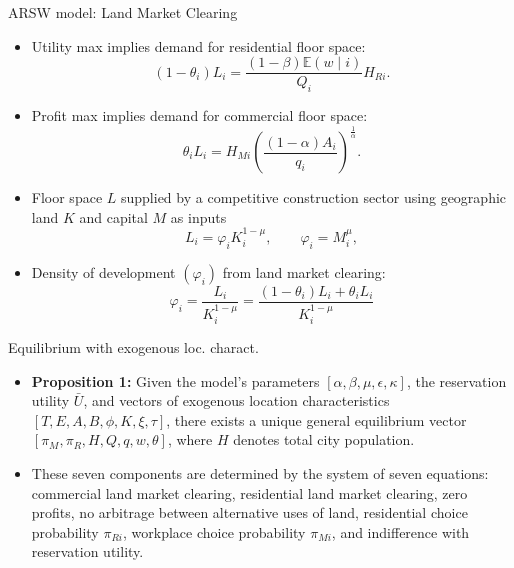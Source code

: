 \documentclass[10pt,notes=hide]{beamer}
\begin{document}
\begin{frame}{ARSW model:  Land Market Clearing}
\begin{itemize}
\item Utility max implies demand for residential floor space:
\begin{equation*} \label{eq:res_mc}
(1-\theta_{i}) L_{i} = \frac{ (1-\beta) \mathbb{E}(w \mid i) }{Q_i} H_{Ri}.
\end{equation*}
\item Profit max implies demand for commercial floor space:
\begin{equation*} \label{eq:com_mc}
\theta_{i} L_{i} = H_{Mi} \left( \frac{(1-\alpha) A_{i}}{q_{i}} \right)^{\frac{1}{\alpha}}.
\end{equation*}
\item Floor space $L$ supplied by a competitive construction sector using geographic land $K$ and capital $M$ as inputs
\begin{equation*}
L_{i} = \varphi_{i} K_{i}^{1-\mu} , \qquad \varphi_{i}=M_{i}^{\mu},
\end{equation*}
\item Density of development $(\varphi_{i})$ from land market clearing:
\[
\varphi_{i} = \frac{L_{i}}{K_{i}^{1-\mu}} = \frac{(1-\theta_{i}) L_{i} + \theta_{i} L_{i}}{K_{i}^{1-\mu}}
\]
\end{itemize}
\end{frame}
\begin{frame}{Equilibrium with exogenous loc. charact.}
\begin{itemize}
\item \textbf{Proposition 1:} Given the model's parameters $[\alpha,\beta,\mu,\epsilon,\kappa]$, the reservation utility $\bar{U}$, and vectors of exogenous location characteristics $[T,E,A,B,\phi,K,\xi,\tau]$, there exists a unique general equilibrium vector $[\pi_{M},\pi_{R},H,Q,q,w,\theta]$, where $H$ denotes total city population. 
\item These seven components are determined by the system of seven equations: 
commercial land market clearing, %
residential land market clearing, %
zero profits, %
no arbitrage between alternative uses of land, %
residential choice probability $\pi_{Ri}$, %
workplace choice probability $\pi_{Mi}$, %
and indifference with reservation utility. %
\end{itemize}
\end{frame}
\end{document}
